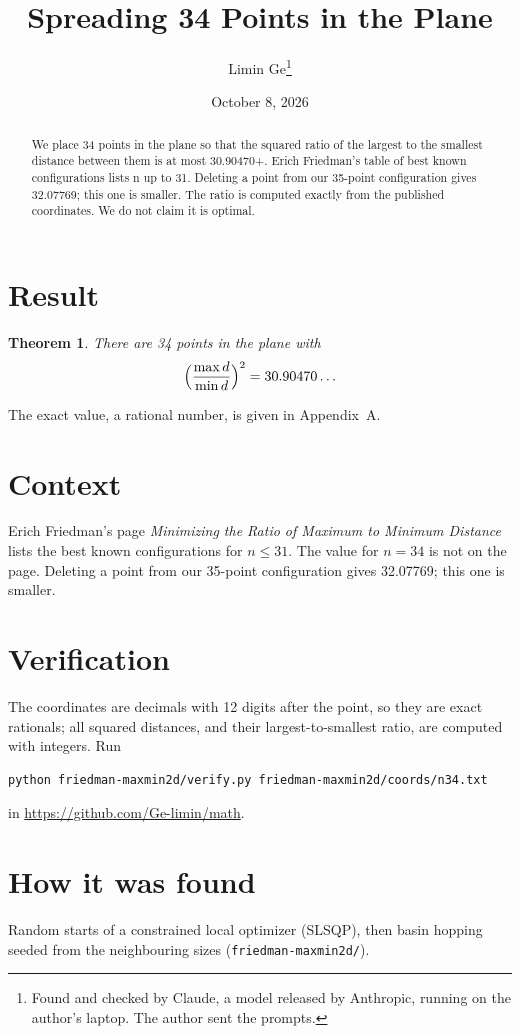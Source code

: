 \documentclass[11pt,a4paper]{article}
\title{Spreading 34 Points in the Plane}
\author{Limin Ge\thanks{Found and checked by Claude, a model released by Anthropic, running on the author's laptop. The author sent the prompts.}}
\date{October 8, 2026}
\newtheorem*{theorem}{Theorem}
\begin{document}
\maketitle
\begin{abstract}
We place 34 points in the plane so that the squared ratio of the largest to the smallest distance between them is at most 30.90470+. Erich Friedman's table of best known configurations lists n up to 31. Deleting a point from our 35-point configuration gives 32.07769; this one is smaller. The ratio is computed exactly from the published coordinates. We do not claim it is optimal.
\end{abstract}

\section{Result}
\begin{theorem}
There are 34 points in the plane with
\[ \Bigl(\frac{\max d}{\min d}\Bigr)^2 = 30.90470\ldots \]
\end{theorem}
The exact value, a rational number, is given in Appendix~A.


\section{Context}
Erich Friedman's page \emph{Minimizing the Ratio of Maximum to Minimum Distance} lists the best known configurations for $n\le 31$. The value for $n=34$ is not on the page. Deleting a point from our 35-point configuration gives 32.07769; this one is smaller.


\section{Verification}
The coordinates are decimals with 12 digits after the point, so they are exact rationals; all squared distances, and their largest-to-smallest ratio, are computed with integers. Run
\begin{verbatim}
python friedman-maxmin2d/verify.py friedman-maxmin2d/coords/n34.txt
\end{verbatim}
in \url{https://github.com/Ge-limin/math}.


\section{How it was found}
Random starts of a constrained local optimizer (SLSQP), then basin hopping seeded from the neighbouring sizes (\texttt{friedman-maxmin2d/}).
\end{document}
